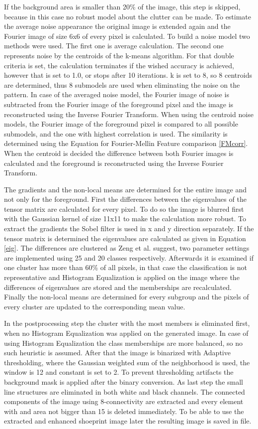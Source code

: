 \documentclass[draft,final]{vutinfth} %
\begin{document}
If the background area is smaller than 20\% of the image, this step is skipped, because in this case no robust model about the clutter can be made.
To estimate the average noise appearance the original image is extended again and the Fourier image of size 6x6 of every pixel is calculated.
To build a noise model two methods were used.
The first one is average calculation.
The second one represents noise by the centroids of the k-means algorithm.
For that double criteria is set, the calculation terminates if the wished accuracy is achieved, however that is set to 1.0, or stops after 10 iterations.
k is set to 8, so 8 centroids are determined, thus 8 submodels are used when eliminating the noise on the pattern.
In case of the averaged noise model, the Fourier image of noise is subtracted from the Fourier image of the foreground pixel and the image is reconstructed using the Inverse Fourier Transform.
When using the centroid noise models, the Fourier image of the foreground pixel is compared to all possible submodels, and the one with highest correlation is used.
The similarity is determined using the Equation for Fourier-Mellin Feature comparison \ref{FMcorr}.
When the centroid is decided the difference between both Fourier images is calculated and the foreground is reconstructed using the Inverse Fourier Transform.
\par
The gradients and the non-local means are determined for the entire image and not only for the foreground.
First the differences between the eigenvalues of the tensor matrix are calculated for every pixel.
To do so the image is blurred first with the Gaussian kernel of size 11x11 to make the calculation more robust.
To extract the gradients the Sobel filter is used in x and y direction separately.
If the tensor matrix is determined the eigenvalues are calculated as given in Equation \ref{eig}.
The differences are clustered as  Zeng et al. \cite{zeng2011region} suggest, two parameter settings are implemented using 25 and 20 classes respectively.
Afterwards it is examined if one cluster has more than 60\% of all pixels, in that case the classification is not representative and Histogram Equalization is applied on the image where the differences of eigenvalues are stored and the memberships are recalculated.
Finally the non-local means are determined for every subgroup and the pixels of every cluster are updated to the corresponding mean value.
\par
In the postprocessing step the cluster with the most members is eliminated first, when no Histogram Equalization was applied on the generated image.
In case of using Histogram Equalization the class memberships are more balanced, so no such heuristic is assumed.
After that the image is binarized with Adaptive thresholding, where  the Gaussian weighted sum of the neighborhood is used, the window is 12 and constant is set to 2.
To prevent thresholding artifacts the background mask is applied after the binary conversion.
As last step the small line structures are eliminated in both white and black channels.
The connected components of the image using 8-connectivity are extracted and every element with and area not bigger than 15 is deleted immediately.
To be able to use the extracted and enhanced shoeprint image later the resulting image is saved in file.
\end{document}
